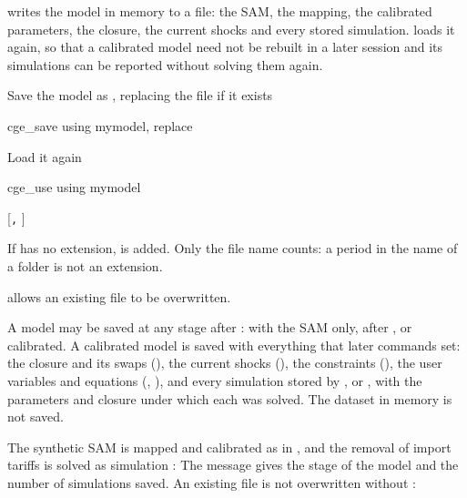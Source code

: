 

 writes the model in memory to a file: the SAM, the mapping, the
calibrated parameters, the closure, the current shocks and every stored
simulation.  loads it again, so that a calibrated model need not
be rebuilt in a later session and its simulations can be reported without
solving them again.


Save the model as , replacing the file if it exists
\begin{stcode}
cge_save using mymodel, replace
\end{stcode}
Load it again
\begin{stcode}
cge_use using mymodel
\end{stcode}


\begin{stsyntax}
   [\texttt{,} ]
\end{stsyntax}
If  has no extension,  is added. Only the file
name counts: a period in the name of a folder is not an extension.


\begin{optdesc}
\item[\opt{}{replace}] allows an existing file to be overwritten.
\end{optdesc}


A model may be saved at any stage after : with the SAM only,
after , or calibrated. A calibrated model is saved with
everything that later commands set: the closure and its swaps
(), the current shocks (), the
constraints (), the user variables and equations
(, ), and every simulation stored by
,  or , with the
parameters and closure under which each was solved. The dataset in memory is
not saved.


The synthetic SAM is mapped and calibrated as in , and the
removal of import tariffs is solved as simulation :
The message gives the stage of the model and the number of simulations saved.
An existing file is not overwritten without :

